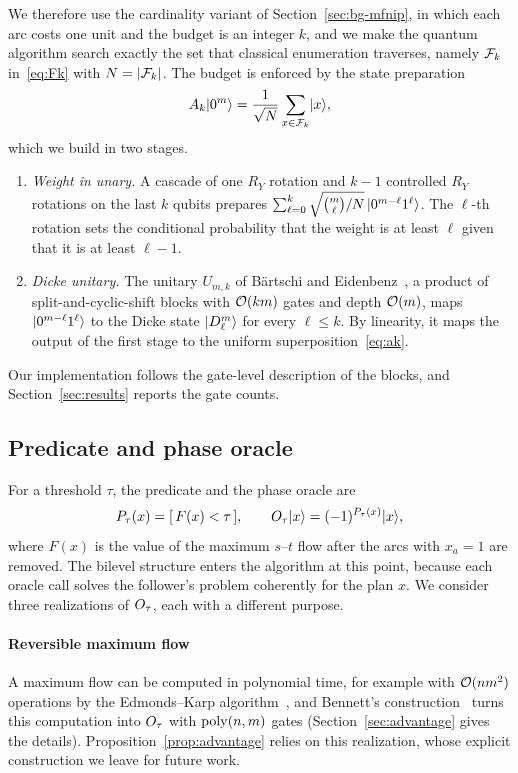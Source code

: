 We therefore use the cardinality variant of Section~\ref{sec:bg-mfnip}, in which each arc costs one unit and the budget is an integer $k$, and we make the quantum algorithm search exactly the set that classical enumeration traverses, namely $\mathcal{F}_k$ in~\eqref{eq:Fk} with $N=|\mathcal{F}_k|$. The budget is enforced by the state preparation
\begin{equation}\label{eq:ak}
A_k\lvert 0^m \rangle = \frac{1}{\sqrt{N}}\sum_{x\in\mathcal{F}_k}\lvert x \rangle,
\end{equation}
which we build in two stages.
\begin{enumerate}
\item \emph{Weight in unary.} A cascade of one $R_Y$ rotation and $k-1$ controlled $R_Y$ rotations on the last $k$ qubits prepares $\sum_{\ell=0}^{k}\sqrt{\binom{m}{\ell}/N}\,\lvert 0^{m-\ell}1^{\ell} \rangle$. The $\ell$-th rotation sets the conditional probability that the weight is at least $\ell$ given that it is at least $\ell-1$.
\item \emph{Dicke unitary.} The unitary $U_{m,k}$ of B\"artschi and Eidenbenz~\cite{bartschi2019}, a product of split-and-cyclic-shift blocks with $\mathcal{O}(km)$ gates and depth $\mathcal{O}(m)$, maps $\lvert 0^{m-\ell}1^{\ell} \rangle$ to the Dicke state $\lvert D^m_\ell \rangle$ for every $\ell\le k$. By linearity, it maps the output of the first stage to the uniform superposition~\eqref{eq:ak}.
\end{enumerate}
Our implementation follows the gate-level description of the blocks, and Section~\ref{sec:results} reports the gate counts.

\subsection{Predicate and phase oracle}\label{sec:interface-oracle}
For a threshold $\tau$, the predicate and the phase oracle are
\begin{equation}\label{eq:oracle}
P_\tau(x) = [\,F(x) < \tau\,], \qquad O_\tau\lvert x \rangle = (-1)^{P_\tau(x)}\lvert x \rangle,
\end{equation}
where $F(x)$ is the value of the maximum $s$--$t$ flow after the arcs with $x_a=1$ are removed. The bilevel structure enters the algorithm at this point, because each oracle call solves the follower's problem coherently for the plan $x$. We consider three realizations of $O_\tau$, each with a different purpose.

\paragraph{Reversible maximum flow} A maximum flow can be computed in polynomial time, for example with $\mathcal{O}(nm^2)$ operations by the Edmonds--Karp algorithm~\cite{ahuja1993}, and Bennett's construction~\cite{bennett1973} turns this computation into $O_\tau$ with $\operatorname{poly}(n,m)$ gates (Section~\ref{sec:advantage} gives the details). Proposition~\ref{prop:advantage} relies on this realization, whose explicit construction we leave for future work.

